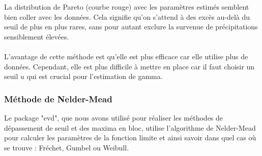 \documentclass{article}
\begin{document}
La distribution de Pareto (courbe rouge) avec les paramètres estimés semblent bien coller avec les données. Cela signifie qu’on s’attend à des excès au-delà du seuil de plus en plus rares, sans pour autant exclure la survenue de précipitations sensiblement élevées.
\\
\\
L'avantage de cette méthode est qu'elle est plus efficace car elle utilise plus de données. Cependant, elle est plus difficile à mettre en place car il faut choisir un seuil $u$ qui est crucial pour l'estimation de gamma.


\subsubsection{Méthode de Nelder-Mead}

\noindent Le package "evd", que nous avons utilisé pour réaliser les méthodes de dépassement de seuil et des maxima en bloc, utilise l'algorithme de Nelder-Mead pour calculer les paramètres de la fonction limite et ainsi savoir dans quel cas où se trouve : Fréchet, Gumbel ou Weibull. \\
\end{document}
